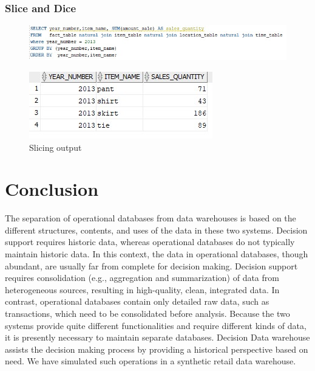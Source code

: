 \documentclass[12pt]{article}
\begin{document}
\subsubsection*{Slice and Dice}
\begin{figure}[H]
	\centering
	\includegraphics[]{sd-code.jpg}
\end{figure}

\begin{figure}[H]
	\centering
	\includegraphics[]{sd.jpg}
	\caption{Slicing output}
\end{figure}
\section{Conclusion}
The separation of operational databases from data warehouses is based on
the different structures, contents, and uses of the data in these two systems. Decision support requires historic data, whereas operational databases do not typically maintain historic data. In this context, the data in operational databases, though abundant, are
usually far from complete for decision making. Decision support requires consolidation
(e.g., aggregation and summarization) of data from heterogeneous sources, resulting
in high-quality, clean, integrated data. In contrast, operational databases contain only
detailed raw data, such as transactions, which need to be consolidated before analysis.
Because the two systems provide quite different functionalities and require different
kinds of data, it is presently necessary to maintain separate databases. Decision
Data warehouse assists the decision making process by providing a historical perspective based on need. We have simulated such operations in a synthetic retail data warehouse.
\end{document}
